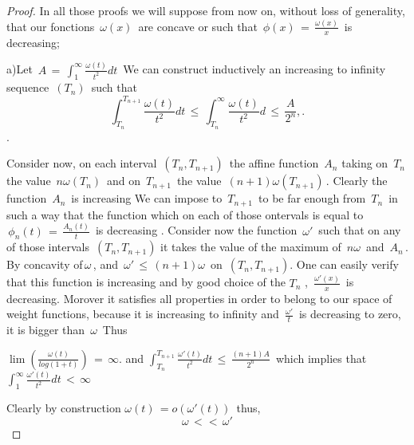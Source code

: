 \documentclass[12pt,a4paper]{amsart}
\begin{document}
\begin{proof}


In all those proofs we will suppose from now on, without loss of generality, that our fonctions $\, \omega(x)\,$ are concave or  such that $\,\phi(x)\,=\,\frac{\omega(x)}{x}\,$ is decreasing;

a)Let $\,A\,=\,\int_1^\infty \frac{\omega(t)}{t^2}dt\,$
We can construct inductively an increasing to infinity sequence $\,(T_n)\,$ such that
$$\int_{T_n}^{T_{n+1}}\frac{\omega(t)}{t^2}dt\,
\leq\,\int_{T_n}^\infty \frac{\omega(t)}{t^2}d\,
\leq\,\frac{A}{2^n},.$$.


 Consider now, on each interval
 $\,(T_n,T_{n+1})\,$ the affine function 
$\,A_n$ taking on $\,T_n\,$ the 
value $\,n\omega(T_n)\,$ and on $\,T_{n+1}\,$ the value
$\,(n+1)\omega(T_{n+1})\,$.
Clearly the function $\,A_n\,$ is increasing
We can impose to  $\,T_{n+1}\,$ to be far enough from 
$\,T_n\,$ in such a way that the function which on each of those ontervals is equal to
$\,\phi_n(t)\,=\,\frac{A_n(t)}{t }\,$ is decreasing .
 Consider now the function $\,\omega'\,$
 such that on any of those intervals $\,(T_n,T_{n+1})$ it takes the value of the maximum of
  $\,n\omega\,$ and $\,A_n\,$. By concavity of$\, \omega\,$, and $\, \omega'\,\leq\, (n+1)\omega\,$ on $\,(T_n,T_{n+1})$. One  can easily verify that this function is increasing and by good choice of the $T_n$ ,
   $\,\frac{\omega'(x)}{x}\,$ is decreasing. Morover it satisfies all properties in order to belong to our space of weight functions, because it is increasing to infinity and
   $\,\frac{\omega'}{t}\, $ is decreasing to zero,
   it is bigger than $\,\omega\,$ Thus
   
   $\lim(\frac{\omega(t)}{log(1+t)})\,=\,\infty.$
    and  
   $\int_{T_n}^{T_{n+1}}\frac{\omega'(t)}{t^2}dt \,\leq\,
   \frac{(n+1)A}{2^n}\,$ which implies that 
   $\int_1^\infty\frac{\omega'(t)}{t^2}dt \,<\,\infty\,$ 
    
   Clearly by construction $\omega(t)\,= o(\omega'(t))\,$ 
thus,$$\,\omega\,<<\,\omega'\,$$


\end{proof}
\end{document}
